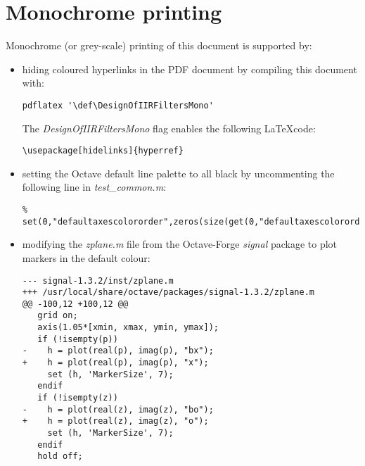 \documentclass[a4paper,twoside,10pt,english]{report}
\begin{document}
\section*{Monochrome printing}
Monochrome (or grey-scale) printing of this document is supported by:
\begin{itemize}
\item hiding coloured hyperlinks in the PDF document by compiling this 
document with:
\begin{small}
\begin{verbatim}
pdflatex '\def\DesignOfIIRFiltersMono'
\end{verbatim}
\end{small}
The \emph{DesignOfIIRFiltersMono} flag enables the following \LaTeX code:
\begin{small}
\begin{verbatim}
\usepackage[hidelinks]{hyperref} 
\end{verbatim}
\end{small}

\item setting the Octave default line palette to all black by uncommenting the
following line in \emph{test\_common.m}:
\begin{small}
\begin{verbatim}
% set(0,"defaultaxescolororder",zeros(size(get(0,"defaultaxescolororder"))));
\end{verbatim}
\end{small}

\item modifying the \emph{zplane.m} file from the Octave-Forge \emph{signal} 
package to plot markers in the default colour:
\begin{small}
\begin{verbatim}
--- signal-1.3.2/inst/zplane.m
+++ /usr/local/share/octave/packages/signal-1.3.2/zplane.m
@@ -100,12 +100,12 @@
   grid on;
   axis(1.05*[xmin, xmax, ymin, ymax]);
   if (!isempty(p))
-    h = plot(real(p), imag(p), "bx");
+    h = plot(real(p), imag(p), "x");
     set (h, 'MarkerSize', 7);
   endif
   if (!isempty(z))
-    h = plot(real(z), imag(z), "bo");
+    h = plot(real(z), imag(z), "o");
     set (h, 'MarkerSize', 7);
   endif
   hold off;
\end{verbatim}
\end{small}
\end{itemize}

\end{document}
